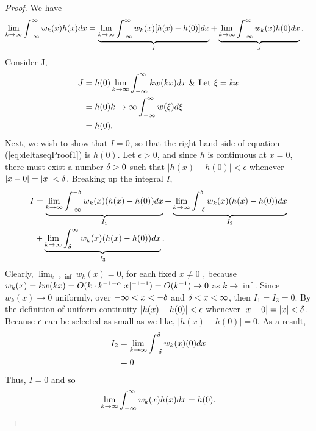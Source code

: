\begin{proof}    
    We have
    \begin{equation}\label{eq:deltaseqProof1}
        \begin{split}
            \lim_{k\rightarrow \infty}\int_{-\infty}^{\infty} w_k(x)h(x) dx &= \underbrace{\lim_{k\rightarrow\infty} \int_{-\infty}^{\infty} w_k(x)[h(x)-h(0)]dx}_I+ \underbrace{\lim_{k\rightarrow\infty} \int_{-\infty}^{\infty} w_k(x)h(0)dx}_J.
        \end{split}
    \end{equation}
    Consider J,
    \begin{equation}
        \begin{split}
            J &= h(0) \lim_{k\rightarrow\inf} \intR kw(kx)dx\ \&\ \text{Let  }\xi =kx\\
            &=h(0){k\rightarrow \inf} \intR w(\xi) d\xi\\
            &= h(0).
        \end{split}
    \end{equation}
    Next, we wish to show that \(I=0\), so that the right hand side of equation (\ref{eq:deltaseqProof1}) is \(h(0)\). Let \(\epsilon > 0\), and since \(h\) is continuous at \(x=0\), there must exist a number \(\delta>0\) such that \(|h(x)-h(0)|<\epsilon\) whenever \(|x-0|=|x|<\delta\). Breaking up the integral \(I\),
    \begin{equation}
        \begin{split}
            I &= \underbrace{\lim_{k\rightarrow \infty} \int_{-\infty}^{-\delta} w_k(x)(h(x)-h(0)) dx}_{I_1} + \underbrace{\lim_{k\rightarrow \infty} \int_{-\delta}^{\delta} w_k(x)(h(x)-h(0)) dx}_{I_2} \\ & + \underbrace{\lim_{k\rightarrow \infty} \int_{\delta}^{\infty} w_k(x)(h(x)-h(0)) dx}_{I_3}.\\
        \end{split}
    \end{equation}
    Clearly, \( \lim_{k\rightarrow \inf} w_k(x)=0\), for each fixed \(x \neq 0\) , because \(w_k(x)=kw(kx)=O(k\cdot k^{-1-\alpha} |x|^{-1-1}) = O(k^{-1}) \rightarrow 0\) as \(k \rightarrow \inf\). 
    Since \(w_k(x)\rightarrow 0\) uniformly, over \(-\infty< x < -\delta\) and \(\delta < x < \infty \), then \(I_1=I_3 =0\). By the definition of uniform continuity \(|h(x)-h(0)|<\epsilon\) whenever \(|x-0|=|x|<\delta\). Because \(\epsilon\) can be selected as small as we like, \(|h(x)-h(0)|=0\). As a result,
    \begin{equation*}
        \begin{split}
            I_2 &= \lim_{k\rightarrow \infty} \int_{-\delta}^{\delta} w_k(x)(0) dx\\
            &=0
        \end{split}
    \end{equation*}
    Thus, \(I=0\) and so 
    \begin{equation}
        \lim_{k\rightarrow \infty}\int_{-\infty}^{\infty} w_k(x)h(x) dx = h(0).
    \end{equation}

    
\end{proof}

